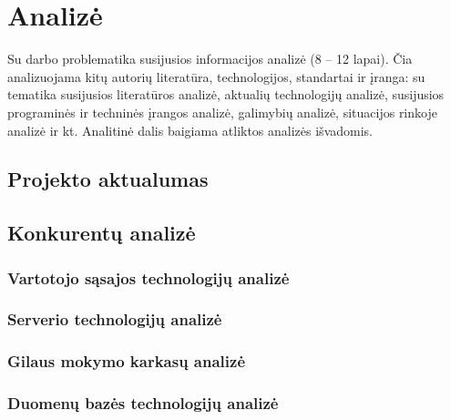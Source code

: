 \section{Analizė}
Su darbo problematika susijusios informacijos analizė (8 – 12 lapai). Čia analizuojama kitų autorių literatūra, technologijos, standartai ir įranga: su tematika susijusios literatūros analizė, aktualių technologijų analizė, susijusios programinės ir techninės įrangos analizė, galimybių analizė, situacijos rinkoje analizė ir kt. Analitinė dalis baigiama atliktos analizės išvadomis.
\subsection{Projekto aktualumas} 
\subsection{Konkurentų analizė}
\subsubsection{Vartotojo sąsajos technologijų analizė}
\subsubsection{Serverio technologijų analizė}
\subsubsection{Gilaus mokymo karkasų analizė}
\subsubsection{Duomenų bazės technologijų analizė}
